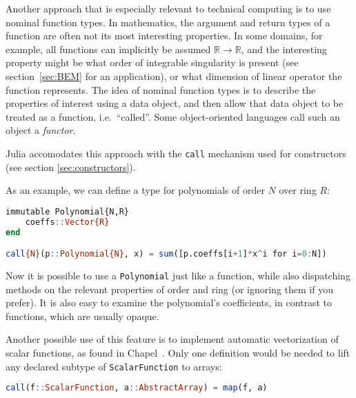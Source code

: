 
Another approach that is especially relevant to technical computing is to use
nominal function types.
In mathematics, the argument and return types of a function are often not
its most interesting properties.
In some domains, for example, all functions can implicitly be assumed
$\mathbb{R}\rightarrow\mathbb{R}$, and the interesting property might be
what order of integrable singularity is present (see section~\ref{sec:BEM} for
an application), or what dimension of linear operator the function represents.
The idea of nominal function types is to describe the properties of interest
using a data object, and then allow that data object to be treated as a
function, i.e.\ ``called''. Some object-oriented languages call such an object
a \emph{functor}.

Julia accomodates this approach with the \texttt{call} mechanism used for
constructors (see section \ref{sec:constructors}).

As an example, we can define a type for polynomials of order $N$ over ring
$R$:

\begin{singlespace}
\begin{lstlisting}[language=julia]
immutable Polynomial{N,R}
    coeffs::Vector{R}
end

call{N}(p::Polynomial{N}, x) = sum([p.coeffs[i+1]*x^i for i=0:N])
\end{lstlisting}
\end{singlespace}

\noindent
Now it is possible to use a \texttt{Polynomial} just like a function, while
also dispatching methods on the relevant properties of order and ring
(or ignoring them if you prefer).
It is also easy to examine the polynomial's coefficients, in contrast to
functions, which are usually opaque.


Another possible use of this feature is to implement automatic vectorization
of scalar functions, as found in Chapel~\cite{chamberlain2007parallel}.
Only one definition would be needed to lift any declared subtype of
\texttt{ScalarFunction} to arrays:

\begin{singlespace}
\begin{lstlisting}[language=julia]
call(f::ScalarFunction, a::AbstractArray) = map(f, a)
\end{lstlisting}
\end{singlespace}

